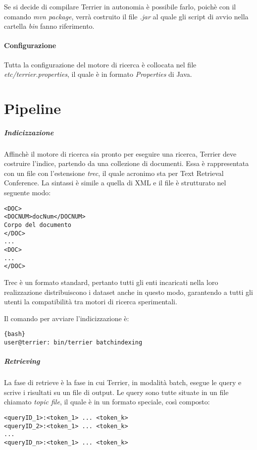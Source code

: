 Se si decide di compilare Terrier in autonomia è possibile farlo, poichè con il comando \textit{mvn package},
verrà costruito il file \textit{.jar} al quale gli script di avvio nella cartella \textit{bin} fanno riferimento.

\paragraph{Configurazione}
Tutta la configurazione del motore di ricerca è collocata nel file \textit{etc/terrier.properties}, il quale
è in formato \textit{Properties} di Java.

\section{Pipeline}
\subparagraph{Indicizzazione} Affinchè il motore di ricerca sia pronto per eseguire una ricerca,
Terrier deve costruire l'indice, partendo
da una collezione di documenti. Essa è rappresentata con un file con l'estensione \textit{trec},
il quale acronimo sta per Text Retrieval Conference.
La sintassi è simile a quella di XML e il file è strutturato nel seguente modo:

\begin{lstlisting}
<DOC>
<DOCNUM>docNum</DOCNUM>
Corpo del documento
</DOC>
...
<DOC>
...
</DOC>
\end{lstlisting}

Trec è un formato standard, pertanto tutti gli enti incaricati
nella loro realizzazione distribuiscono i dataset anche in questo
modo, garantendo a tutti gli utenti la compatibilità tra motori
di ricerca sperimentali.

Il comando per avviare l'indicizzazione è:

\begin{lstlisting}{bash}
user@terrier: bin/terrier batchindexing
\end{lstlisting}

\pagebreak

\subparagraph{Retrieving}
La fase di retrieve è la fase in cui Terrier, in modalità batch, esegue le query
e scrive i risultati su un file di output.
Le query sono tutte situate in un file chiamato \textit{topic file}, il quale
è in un formato speciale, così composto:
\begin{lstlisting}
<queryID_1>:<token_1> ... <token_k>
<queryID_2>:<token_1> ... <token_k>
...
<queryID_n>:<token_1> ... <token_k>
\end{lstlisting}

